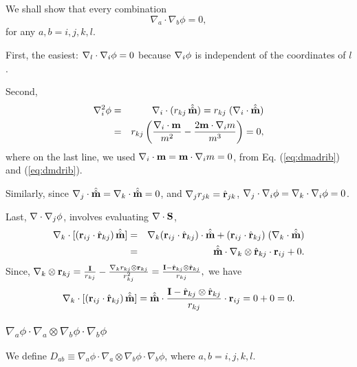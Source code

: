 \documentclass{article}
\begin{document}
We shall show that every combination
\begin{equation}
\nabla_a \cdot \nabla_b \phi = 0,
\end{equation}
for any $a, b = i, j, k, l$.

First, the easiest: $\nabla_l \cdot \nabla_i \phi = 0$
because $\nabla_i \phi$ is independent of the coordinates of $l$.


Second,
\begin{eqnarray*}
\nabla_i^2 \phi
&=& \nabla_i \cdot (r_{kj} \, \hat{\hat{\mathbf{m}}})
 =  r_{kj} \; ( \nabla_i \cdot \hat{\hat{\mathbf{m}}} ) \\
&=& r_{kj}
  \left(
    \frac {\nabla_i \cdot \mathbf{m}} {m^2}
    - \frac {2 \mathbf{m} \cdot \nabla_i m} {m^3}
  \right) = 0,
\end{eqnarray*}
where on the last line, we used
$\nabla_i \cdot \mathbf{m} = \mathbf{m} \cdot \nabla_i m = 0$,
from Eq. (\ref{eq:dmadrib}) and (\ref{eq:dmdrib}).


Similarly, since
$\nabla_j \cdot \hat{\hat{\mathbf{m}}} = \nabla_k \cdot \hat{\hat{\mathbf{m}}} = 0$,
and
$\nabla_j r_{jk} = \hat{\mathbf{r}}_{jk}$,
%
$\nabla_j \cdot \nabla_i \phi = \nabla_k \cdot \nabla_i \phi = 0$.
%

Last, $\nabla \cdot \nabla_j \phi$, involves evaluating $\nabla \cdot \mathbf{S}$,
\begin{eqnarray*}
\nabla_k \cdot [ ( \mathbf{r}_{ij} \cdot \hat{\mathbf{r}}_{kj}) \, \hat{\hat{\mathbf{m}}}]
&=&
\nabla_k ( \mathbf{r}_{ij} \cdot \hat{\mathbf{r}}_{kj}) \cdot \hat{\hat{\mathbf{m}}}
+
( \mathbf{r}_{ij} \cdot \hat{\mathbf{r}}_{kj}) \; (\nabla_k \cdot \hat{\hat{\mathbf{m}}}) \\
&=&
\hat{\hat{\mathbf{m}}} \cdot \nabla_k \otimes \hat{\mathbf{r}}_{kj} \cdot \mathbf{r}_{ij}
+ 0.
\end{eqnarray*}
%
Since,
$ \nabla_k \otimes \mathbf{r}_{kj}
= \frac {\mathbf I} { r_{kj}}
- \frac { \nabla_k r_{kj} \otimes \mathbf{r}_{kj} }{ r_{kj}^2}
= \frac { {\mathbf I - \hat{\mathbf{r}}_{kj} \otimes \hat{\mathbf{r}}_{kj}} } { r_{kj}},$
%
we have
\begin{eqnarray*}
\nabla_k \cdot [ ( \mathbf{r}_{ij} \cdot \hat{\mathbf{r}}_{kj}) \, \hat{\hat{\mathbf{m}}}]
=
\hat{\hat{\mathbf{m}}} \cdot \frac { {\mathbf I - \hat{\mathbf{r}}_{kj} \otimes \hat{\mathbf{r}}_{kj}} } { r_{kj}} \cdot \mathbf{r}_{ij}
= 0 + 0 = 0.
\end{eqnarray*}



\subsubsection{$\nabla_a \phi \cdot \nabla_a \otimes \nabla_b \phi \cdot \nabla_b \phi$}
We define
$D_{ab} \equiv \nabla_a \phi \cdot \nabla_a \otimes \nabla_b \phi \cdot \nabla_b \phi$,
where $a, b = i, j, k, l$.
\end{document}
